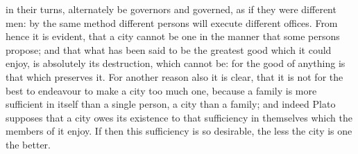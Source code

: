 in their turns, alternately be governors and governed, as if they were
different men: by the same method different persons will execute different
offices. From hence it is evident, that a city cannot be one in the manner
that some persons propose; and that what has been said to be the greatest
good which it could enjoy, is absolutely its destruction, which cannot be:
for the good of anything is that which preserves it. For another reason
also it is clear, that it is not for the best to endeavour to make a city
too much one, because a family is more sufficient in itself than a single
person, a city than a family; and indeed Plato supposes that a city owes
its existence to that sufficiency in themselves which the members of it
enjoy. If then this sufficiency is so desirable, the less the city is one
the better.


